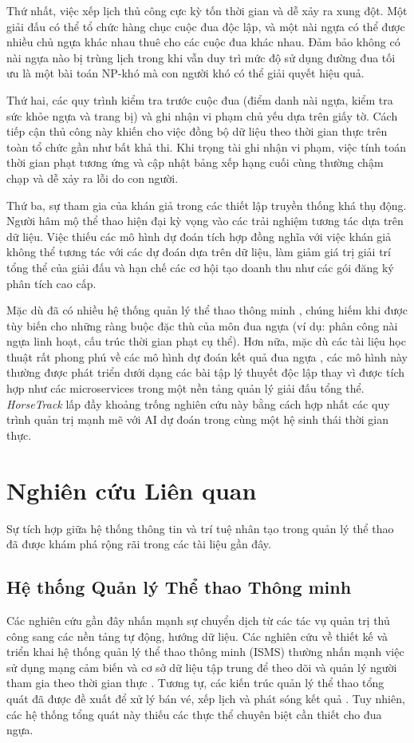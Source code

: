 \documentclass{llncs}
\begin{document}
Thứ nhất, việc xếp lịch thủ công cực kỳ tốn thời gian và dễ xảy ra xung đột. Một giải đấu có thể tổ chức hàng chục cuộc đua độc lập, và một nài ngựa có thể được nhiều chủ ngựa khác nhau thuê cho các cuộc đua khác nhau. Đảm bảo không có nài ngựa nào bị trùng lịch trong khi vẫn duy trì mức độ sử dụng đường đua tối ưu là một bài toán NP-khó mà con người khó có thể giải quyết hiệu quả.

Thứ hai, các quy trình kiểm tra trước cuộc đua (điểm danh nài ngựa, kiểm tra sức khỏe ngựa và trang bị) và ghi nhận vi phạm chủ yếu dựa trên giấy tờ. Cách tiếp cận thủ công này khiến cho việc đồng bộ dữ liệu theo thời gian thực trên toàn tổ chức gần như bất khả thi. Khi trọng tài ghi nhận vi phạm, việc tính toán thời gian phạt tương ứng và cập nhật bảng xếp hạng cuối cùng thường chậm chạp và dễ xảy ra lỗi do con người.

Thứ ba, sự tham gia của khán giả trong các thiết lập truyền thống khá thụ động. Người hâm mộ thể thao hiện đại kỳ vọng vào các trải nghiệm tương tác dựa trên dữ liệu. Việc thiếu các mô hình dự đoán tích hợp đồng nghĩa với việc khán giả không thể tương tác với các dự đoán dựa trên dữ liệu, làm giảm giá trị giải trí tổng thể của giải đấu và hạn chế các cơ hội tạo doanh thu như các gói đăng ký phân tích cao cấp.

Mặc dù đã có nhiều hệ thống quản lý thể thao thông minh \cite{ref_isms,ref_wiley}, chúng hiếm khi được tùy biến cho những ràng buộc đặc thù của môn đua ngựa (ví dụ: phân công nài ngựa linh hoạt, cấu trúc thời gian phạt cụ thể). Hơn nữa, mặc dù các tài liệu học thuật rất phong phú về các mô hình dự đoán kết quả đua ngựa \cite{ref_benter,ref_doi_1,ref_nyc_blog,ref_pmc_predict}, các mô hình này thường được phát triển dưới dạng các bài tập lý thuyết độc lập thay vì được tích hợp như các microservices trong một nền tảng quản lý giải đấu tổng thể. \textit{HorseTrack} lấp đầy khoảng trống nghiên cứu này bằng cách hợp nhất các quy trình quản trị mạnh mẽ với AI dự đoán trong cùng một hệ sinh thái thời gian thực.

\section{Nghiên cứu Liên quan}
Sự tích hợp giữa hệ thống thông tin và trí tuệ nhân tạo trong quản lý thể thao đã được khám phá rộng rãi trong các tài liệu gần đây.

\subsection{Hệ thống Quản lý Thể thao Thông minh}
Các nghiên cứu gần đây nhấn mạnh sự chuyển dịch từ các tác vụ quản trị thủ công sang các nền tảng tự động, hướng dữ liệu. Các nghiên cứu về thiết kế và triển khai hệ thống quản lý thể thao thông minh (ISMS) thường nhấn mạnh việc sử dụng mạng cảm biến và cơ sở dữ liệu tập trung để theo dõi và quản lý người tham gia theo thời gian thực \cite{ref_isms}. Tương tự, các kiến trúc quản lý thể thao tổng quát đã được đề xuất để xử lý bán vé, xếp lịch và phát sóng kết quả \cite{ref_wiley}. Tuy nhiên, các hệ thống tổng quát này thiếu các thực thể chuyên biệt cần thiết cho đua ngựa.
\end{document}
